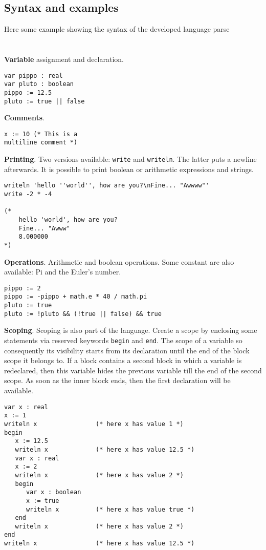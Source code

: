 \documentclass[12pt]{article}
\begin{document}
\subsection{Syntax and examples}
Here some example showing the syntax of the developed language parse\\\\\\
\textbf{Variable} assignment and declaration.
\begin{lstlisting}[frame=single]
var pippo : real
var pluto : boolean
pippo := 12.5
pluto := true || false
\end{lstlisting}
\vspace{2cm}
\textbf{Comments}.
\begin{lstlisting}[frame=single]
x := 10 (* This is a
multiline comment *)
\end{lstlisting}
\pagebreak
\textbf{Printing}. Two versions available: \texttt{write} and \texttt{writeln}. The latter puts a newline afterwards. It is possible to print boolean or arithmetic expressions and strings.
\vspace{0.1cm}
\begin{lstlisting}[frame=single]
writeln	'hello ''world'', how are you?\nFine... "Awwww"'
write -2 * -4

(*
	hello 'world', how are you?
	Fine... "Awww"
	8.000000
*)
\end{lstlisting}
\vspace{2cm}
\textbf{Operations}. Arithmetic and boolean operations. Some constant are also available: Pi and the Euler's number.
\begin{lstlisting}[frame=single]
pippo := 2
pippo := -pippo + math.e * 40 / math.pi
pluto := true
pluto := !pluto && (!true || false) && true
\end{lstlisting}
\vspace{2cm}
\textbf{Scoping}. Scoping is also part of the language. Create a scope by enclosing some statements via reserved keywords \texttt{begin} and \texttt{end}. The scope of a variable so consequently its visibility starts from its declaration until the end of the block scope it belongs to. If a block contains a second block in which a variable is redeclared, then this variable hides the previous variable till the end of the second scope. As soon as the inner block ends, then the first declaration will be available.
\pagebreak
\begin{lstlisting}[frame=single]
var x : real
x := 1
writeln x                (* here x has value 1 *)
begin
   x := 12.5
   writeln x             (* here x has value 12.5 *)
   var x : real
   x := 2
   writeln x             (* here x has value 2 *)
   begin
      var x : boolean
      x := true
      writeln x          (* here x has value true *)
   end
   writeln x             (* here x has value 2 *)
end
writeln x                (* here x has value 12.5 *)
\end{lstlisting}
\vspace{1.5cm}
\end{document}
